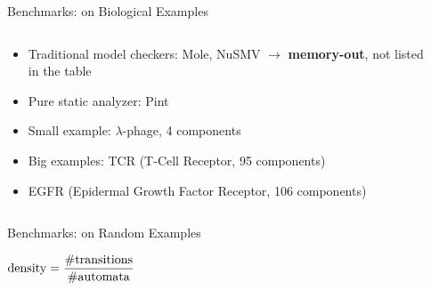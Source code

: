\documentclass[8pt]{beamer}
\newcommand{\highlight}[1]{\textcolor{blue!50}{\textbf{#1}}}
\begin{document}
\begin{frame}{Benchmarks: on Biological Examples}
\begin{columns}
\begin{column}{0.4\textwidth}
\begin{itemize}
\item Traditional model checkers: Mole, NuSMV $\to$ \highlight{memory-out}, not listed in the table
\item Pure static analyzer: Pint~\cite{folschette2015}
\end{itemize}

\vspace{0.3cm}
\begin{itemize}
\item Small example: $\lambda$-phage, 4 components
\item Big examples: TCR (T-Cell Receptor, 95 components)
\item EGFR (Epidermal Growth Factor Receptor, 106 components)
\end{itemize}
\end{column}
\begin{column}{0.6\textwidth}
\small
    \centering
    
\end{column}
\end{columns}



\end{frame}

\begin{frame}{Benchmarks: on Random Examples}



$\rm{density}=\dfrac{\#\rm{transitions}}{\#\rm{automata}}$
\end{frame}
\end{document}
